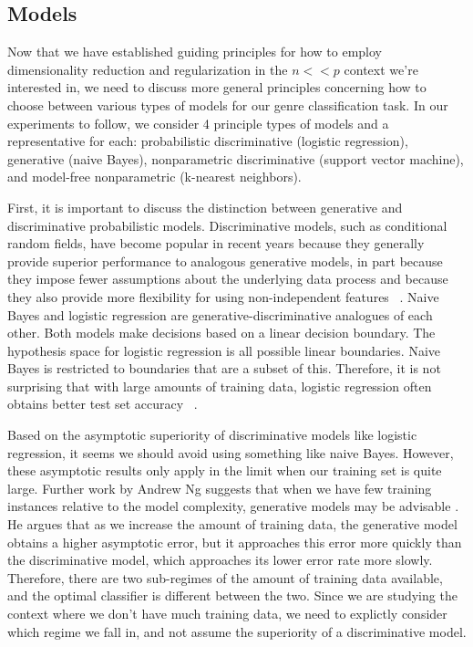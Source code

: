 \documentclass[]{article}
\begin{document}
\subsection{Models}
	Now that we have established guiding principles for how to employ dimensionality reduction and regularization in the $n << p$ context we're interested in, we need to discuss more general principles concerning how to choose between various types of models for our genre classification task. In our experiments to follow, we consider 4 principle types of models and a representative for each: probabilistic discriminative (logistic regression), generative (naive Bayes), nonparametric discriminative (support vector machine), and model-free nonparametric (k-nearest neighbors). 

	First, it is important to discuss the distinction between generative and discriminative probabilistic models. Discriminative models, such as conditional random fields, have become popular in recent years because they generally provide superior performance to analogous generative models, in part because they impose fewer assumptions about the underlying data process and because they also provide more flexibility for using non-independent features ~\cite{lafferty2001conditional}. Naive Bayes and logistic regression are generative-discriminative analogues of each other. Both models make decisions based on a linear decision boundary. The hypothesis space for logistic regression is all possible linear boundaries. Naive Bayes is restricted to boundaries that are a subset of this. Therefore, it is not surprising that with large amounts of training data, logistic regression often obtains better test set accuracy ~\cite{jordan2002discriminative}. 	
	
	Based on the asymptotic superiority of discriminative models like logistic regression, it seems we should avoid using something like naive Bayes. However, these asymptotic results only apply in the limit when our training set is quite large.  Further work by Andrew Ng suggests that when we have few training instances relative to the model complexity, generative models may be advisable \cite{jordan2002discriminative}. He argues that as we increase the amount of training data, the generative model obtains a higher asymptotic error, but it approaches this error more quickly than the discriminative model, which approaches its lower error rate more slowly. Therefore, there are two sub-regimes of the amount of training data available, and  the optimal classifier is different  between the two. Since we are studying the context where we don't have much training data, we need to explictly consider which regime we fall in, and not assume the superiority of a discriminative model.
	
\end{document}
